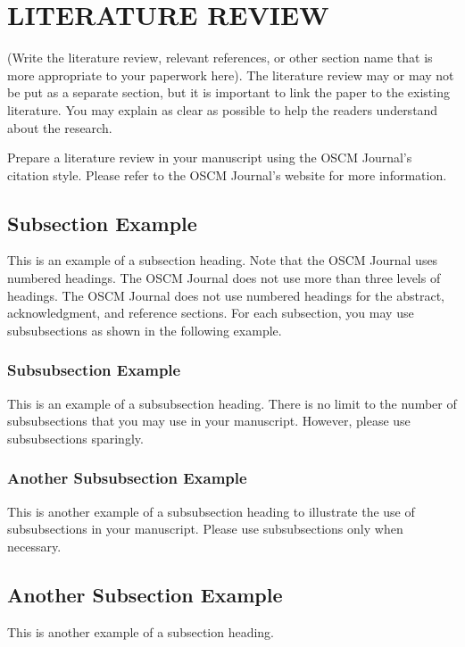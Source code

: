 \documentclass[preprint]{oscmjournal}
\begin{document}
\section{LITERATURE REVIEW}\label{sec:literature_review}
(Write the literature review, relevant references, or other section name that is more appropriate to your paperwork here). The literature review may or may not be put as a separate section, but it is important to link the paper to the existing literature. You may explain as clear as possible to help the readers understand about the research.

Prepare a literature review in your manuscript using the OSCM Journal's citation style. Please refer to the OSCM Journal's website for more information.

\subsection{Subsection Example}\label{sec:subsection_example}
This is an example of a subsection heading. Note that the OSCM Journal uses numbered headings. The OSCM Journal does not use more than three levels of headings. The OSCM Journal does not use numbered headings for the abstract, acknowledgment, and reference sections. For each subsection, you may use subsubsections as shown in the following example.

\subsubsection{Subsubsection Example}\label{sec:subsubsection_example}
This is an example of a subsubsection heading. There is no limit to the number of subsubsections that you may use in your manuscript. However, please use subsubsections sparingly. 

\subsubsection{Another Subsubsection Example}\label{sec:another_subsubsection_example}
This is another example of a subsubsection heading to illustrate the use of subsubsections in your manuscript. Please use subsubsections only when necessary.

\subsection{Another Subsection Example}\label{sec:another_subsection_example}
This is another example of a subsection heading. 
\end{document}
